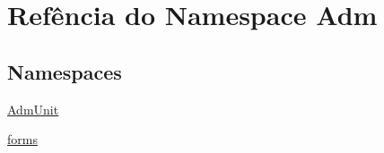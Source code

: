 \hypertarget{namespaceAdm}{\section{Refência do Namespace Adm}
\label{namespaceAdm}
}
\subsection*{Namespaces}
\begin{DoxyCompactItemize}
\item 
\hyperlink{namespaceAdm_1_1AdmUnit}{Adm\-Unit}
\item 
\hyperlink{namespaceAdm_1_1forms}{forms}
\end{DoxyCompactItemize}
